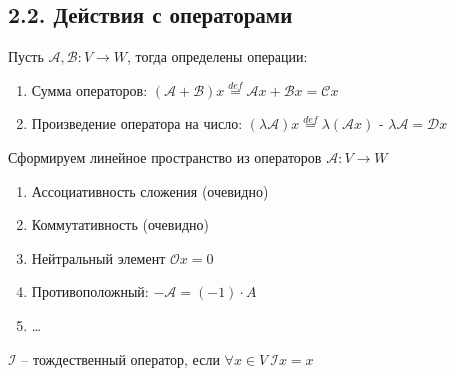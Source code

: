\documentclass[12pt]{article}
\begin{document}
    \subsection[p2\_2]{2.2. Действия с операторами}

    \Def Пусть $\mathcal{A}, \mathcal{B}: V \rightarrow W$, тогда определены операции:

    \begin{enumerate}
        \item Сумма операторов: $(\mathcal{A} + \mathcal{B})x \stackrel{def}{=} \mathcal{A}x + \mathcal{B}x = \mathcal{C}x$
        \item Произведение оператора на число: $(\lambda\mathcal{A})x \stackrel{def}{=} \lambda(\mathcal{A}x)$ - $\lambda\mathcal{A} = \mathcal{D}x$
    \end{enumerate}

    \Nota Сформируем линейное пространство из операторов $\mathcal{A}: V \rightarrow W$

    \begin{enumerate}
        \item Ассоциативность сложения (очевидно)
        \item Коммутативность (очевидно)
        \item Нейтральный элемент $\mathcal{O}x = 0$
        \item Противоположный: $-\mathcal{A} = (-1) \cdot A$
        \item \dots \Lab
    \end{enumerate}

    \Def $\mathcal{I}$ -- тождественный оператор, если $\forall x \in V \ \mathcal{I}x = x$
\end{document}
